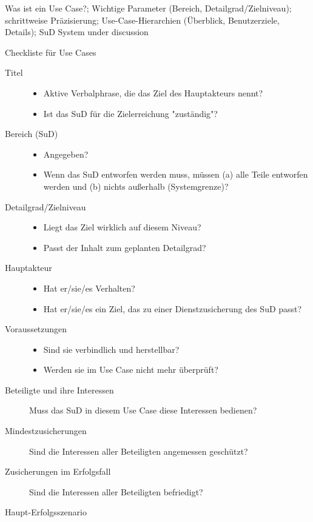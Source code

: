 Was ist ein Use Case?;
Wichtige Parameter (Bereich, Detailgrad/Zielniveau);
schrittweise Präzisierung;
Use-Case-Hierarchien (Überblick, Benutzerziele, Details);
SuD System under discussion

Checkliste für Use Cases
\begin{description}
\item[Titel]
\begin{itemize}
	\item Aktive Verbalphrase, die das Ziel des Hauptakteurs nennt?
	\item Ist das SuD für die Zielerreichung "zuständig"?
	\end{itemize}
\item[Bereich (SuD)]
\begin{itemize}
	\item Angegeben?
	\item Wenn das SuD entworfen werden muss, müssen (a) alle Teile entworfen werden und (b) nichts außerhalb (Systemgrenze)?
	\end{itemize}
\item[Detailgrad/Zielniveau]
\begin{itemize}
	\item Liegt das Ziel wirklich auf diesem Niveau?
	\item Passt der Inhalt zum geplanten Detailgrad?
	\end{itemize}
\item[Hauptakteur]
\begin{itemize}
	\item Hat er/sie/es Verhalten?
	\item Hat er/sie/es ein Ziel, das zu einer Dienstzusicherung des SuD passt?
	\end{itemize}
\item[Voraussetzungen]
\begin{itemize}
	\item Sind sie verbindlich und herstellbar?
	\item Werden sie im Use Case nicht mehr überprüft?
	\end{itemize}
\item[Beteiligte und ihre Interessen]
	Muss das SuD in diesem Use Case diese Interessen bedienen?
\item[Mindestzusicherungen]
	Sind die Interessen aller Beteiligten angemessen geschützt?
\item[Zusicherungen im Erfolgsfall]
	Sind die Interessen aller Beteiligten befriedigt?
\item[Haupt-Erfolgsszenario]

\end{description}

